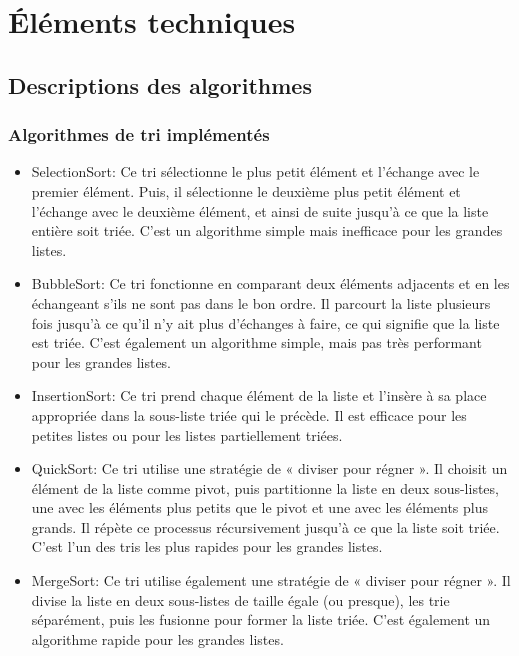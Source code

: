 \documentclass[10pt,a4paper]{article}
\begin{document}
        
    
         
        
    
\section{Éléments techniques}
    \subsection{Descriptions des algorithmes}
    \subsubsection{Algorithmes de tri implémentés}
     \begin{itemize}  
     
        \item SelectionSort: Ce tri sélectionne le plus petit élément et l'échange avec le premier élément. Puis, il sélectionne le deuxième plus petit élément et l'échange avec le deuxième élément, et ainsi de suite jusqu'à ce que la liste entière soit triée. C'est un algorithme simple mais inefficace pour les grandes listes.

        \item BubbleSort: Ce tri fonctionne en comparant deux éléments adjacents et en les échangeant s'ils ne sont pas dans le bon ordre. Il parcourt la liste plusieurs fois jusqu'à ce qu'il n'y ait plus d'échanges à faire, ce qui signifie que la liste est triée. C'est également un algorithme simple, mais pas très performant pour les grandes listes.
    
        \item InsertionSort: Ce tri prend chaque élément de la liste et l'insère à sa place appropriée dans la sous-liste triée qui le précède. Il est efficace pour les petites listes ou pour les listes partiellement triées.
    
        \item QuickSort: Ce tri utilise une stratégie de « diviser pour régner ». Il choisit un élément de la liste comme pivot, puis partitionne la liste en deux sous-listes, une avec les éléments plus petits que le pivot et une avec les éléments plus grands. Il répète ce processus récursivement jusqu'à ce que la liste soit triée. C'est l'un des tris les plus rapides pour les grandes listes.
    
        \item MergeSort: Ce tri utilise également une stratégie de « diviser pour régner ». Il divise la liste en deux sous-listes de taille égale (ou presque), les trie séparément, puis les fusionne pour former la liste triée. C'est également un algorithme rapide pour les grandes listes.
    

\end{itemize}
\end{document}
